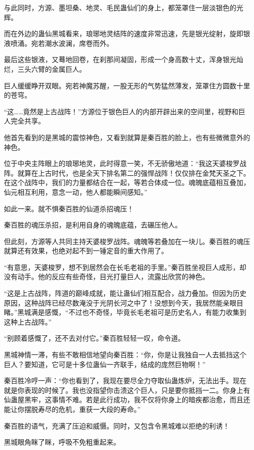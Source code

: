 \begin{this_body}
与此同时，方源、墨坦桑、地灵、毛民蛊仙们的身上，都笼罩住一层淡银色的光辉。

而在外边的蛊仙黑城看来，琅琊地灵结阵的速度非常迅速，先是银光绽射，旋即银液喷涌。宛若潮水波澜，席卷而外。

最后这些银液，又蓦地回卷，在刹那间凝固，形成一个身高数十丈，浑身银光灿烂，三头六臂的金属巨人。

巨人缓缓睁开双眼。宛若神魔苏醒，一股无形的气势猛然薄发，笼罩住方圆数十里的苍穹。

“这……竟然是上古战阵！”方源位于银色巨人的内部开辟出来的空间里，视野和巨人完全共享。

他首先看到的是黑城的震惊神色，又看到就算是秦百胜的脸上，也有些微微意外的神色。

位于中央主阵眼上的琅琊地灵，此时得意一笑，不无骄傲地道：“我这天婆梭罗战阵。就算在上古时代，也是全天下排名第二的强悍战阵！仅仅排在金梵天圣之下。在这个战阵中，我们的力量都结合在一起，等若合体成一位。魂魄底蕴相互叠加，仙元相互利用，意念一动，他人都能瞬间感知。”

如此一来。就不惧秦百胜的仙道杀招魂压！

秦百胜的魂压杀招，是利用自身的魂魄底蕴，去碾压他人。

但此刻，方源等人共同主持天婆梭罗战阵。魂魄等若叠加在一块儿。秦百胜的魂压就算还有效果，也绝对起不到一锤定音的重大作用了。

“有意思，天婆梭罗，想不到居然会在长毛老祖的手里。”秦百胜坐视巨人成形，却没有动手。他的反应有些奇怪，目光打量巨人，流露出欣赏的神色。

“这是上古战阵，阵道的巅峰成就，能让蛊仙们相互配合，战力叠加。但因为历史原因，这种战阵已经尽数淹没于光阴长河之中了！没想到今天，我居然能亲眼目睹。”黑城满是感慨，“不过也不奇怪，毕竟长毛老祖可是历史名人，有能力收集到这种上古战阵。”

“别顾着感慨了，还不去对付它。”秦百胜轻轻一叹，命令道。

黑城神情一滞，有些不敢相信地望向秦百胜：“你，你是让我独自一人去抵挡这个巨人？要知道，它可是十多位蛊仙一齐联手，结成的庞然巨物啊！”

秦百胜冷哼一声：“你也看到了，我现在要尽全力夺取仙蛊炼炉，无法出手。现在就是你表现的时候了。我也没指望你击溃这个巨人，只是要你抵挡一二。你身上有仙蛊屋黑牢，这事情不难。若是此行成功，我不仅将你身上的暗疾都治愈，而且还能让你摆脱寿尽的危机，重获一大段的寿命。”

秦百胜的语气，充满了压迫和威慑。同时，又包含令黑城难以拒绝的利诱！

黑城眼角眯了眯，呼吸不免粗重起来。


\end{this_body}
